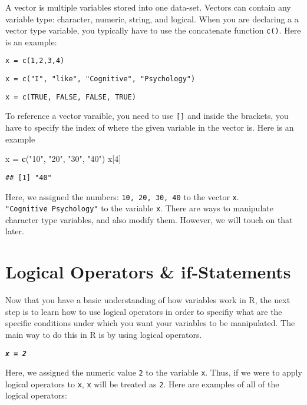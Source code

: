 \documentclass[]{book}
\newenvironment{Shaded}{\begin{snugshade}}{\end{snugshade}}
\newcommand{\KeywordTok}[1]{\textcolor[rgb]{0.13,0.29,0.53}{\textbf{#1}}}
\newcommand{\DecValTok}[1]{\textcolor[rgb]{0.00,0.00,0.81}{#1}}
\newcommand{\StringTok}[1]{\textcolor[rgb]{0.31,0.60,0.02}{#1}}
\newcommand{\NormalTok}[1]{#1}
\begin{document}
A vector is multiple variables stored into one data-set. Vectors can
contain any variable type: character, numeric, string, and logical. When
you are declaring a a vector type variable, you typically have to use
the concatenate function \texttt{c()}. Here is an example:

\texttt{x\ =\ c(1,2,3,4)}

\texttt{x\ =\ c("I",\ "like",\ "Cognitive",\ "Psychology")}

\texttt{x\ =\ c(TRUE,\ FALSE,\ FALSE,\ TRUE)}

To reference a vector varaible, you need to use \texttt{{[}{]}} and
inside the brackets, you have to specify the index of where the given
variable in the vector is. Here is an example

\begin{Shaded}
\begin{Highlighting}[]
\NormalTok{x =}\StringTok{ }\KeywordTok{c}\NormalTok{(}\StringTok{"10"}\NormalTok{, }\StringTok{"20"}\NormalTok{, }\StringTok{"30"}\NormalTok{, }\StringTok{"40"}\NormalTok{)}
\NormalTok{x[}\DecValTok{4}\NormalTok{]}
\end{Highlighting}
\end{Shaded}

\begin{verbatim}
## [1] "40"
\end{verbatim}

Here, we assigned the numbers: \texttt{10,\ 20,\ 30,\ 40} to the vector
\texttt{x}. \texttt{"Cognitive\ Psychology"} to the variable \texttt{x}.
There are ways to manipulate character type variables, and also modify
them. However, we will touch on that later.

\section{Logical Operators \&
if-Statements}\label{logical-operators-if-statements}

Now that you have a basic understanding of how variables work in R, the
next step is to learn how to use logical operators in order to specifiy
what are the specific conditions under which you want your variables to
be manipulated. The main way to do this in R is by using logical
operators.

\textbf{\emph{\texttt{x\ =\ 2}}}

Here, we assigned the numeric value \texttt{2} to the variable
\texttt{x}. Thus, if we were to apply logical operators to \texttt{x},
\texttt{x} will be treated as \texttt{2}. Here are examples of all of
the logical operators:
\end{document}
